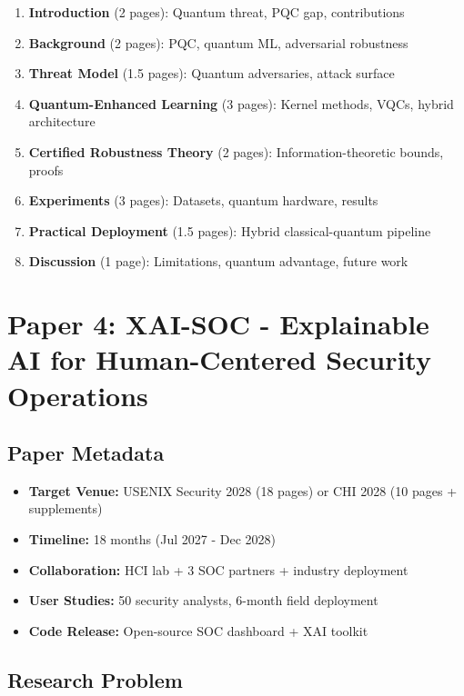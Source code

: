 \documentclass[11pt,letterpaper]{article}
\begin{document}
\begin{enumerate}
\item \textbf{Introduction} (2 pages): Quantum threat, PQC gap, contributions
\item \textbf{Background} (2 pages): PQC, quantum ML, adversarial robustness
\item \textbf{Threat Model} (1.5 pages): Quantum adversaries, attack surface
\item \textbf{Quantum-Enhanced Learning} (3 pages): Kernel methods, VQCs, hybrid architecture
\item \textbf{Certified Robustness Theory} (2 pages): Information-theoretic bounds, proofs
\item \textbf{Experiments} (3 pages): Datasets, quantum hardware, results
\item \textbf{Practical Deployment} (1.5 pages): Hybrid classical-quantum pipeline
\item \textbf{Discussion} (1 page): Limitations, quantum advantage, future work
\end{enumerate}

\newpage

\section{Paper 4: XAI-SOC - Explainable AI for Human-Centered Security Operations}

\subsection{Paper Metadata}

\begin{itemize}[leftmargin=2em]
\item \textbf{Target Venue:} USENIX Security 2028 (18 pages) or CHI 2028 (10 pages + supplements)
\item \textbf{Timeline:} 18 months (Jul 2027 - Dec 2028)
\item \textbf{Collaboration:} HCI lab + 3 SOC partners + industry deployment
\item \textbf{User Studies:} 50 security analysts, 6-month field deployment
\item \textbf{Code Release:} Open-source SOC dashboard + XAI toolkit
\end{itemize}

\subsection{Research Problem}
\end{document}
